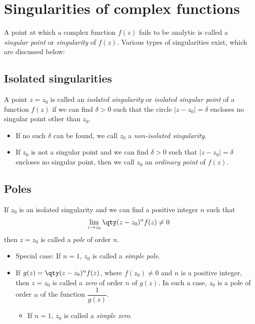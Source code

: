 \section{Singularities of complex functions}
	A point at which a complex function $f(z)$ fails to be analytic is called a \emph{singular point} or \emph{singularity} of $f(z)$. Various types of singularities exist, which are discussed below:
	
	\subsection{Isolated singularities}
		A point $z=z_0$ is called an \emph{isolated singularity} or \emph{isolated singular point} of a function $f(z)$ if we can find $\delta>0$ such that the circle $|z-z_0|=\delta$ encloses no singular point other than $z_0$.
		\begin{itemize}
			\item If no such $\delta$ can be found, we call $z_0$ a \emph{non-isolated singularity}.
			\item If $z_0$ is not a singular point and we can find $\delta>0$ such that $|z-z_0|=\delta$ encloses no singular
			point, then we call $z_0$ an \emph{ordinary point} of $f(z)$.
		\end{itemize}

	\subsection{Poles}
		If $z_0$ is an isolated singularity and we can find a positive integer $n$ such that
		\begin{align*}
			\lim_{z\to z_0}{\qty(z-z_0)^nf(z)\neq 0}
		\end{align*}
		then $z=z_0$ is called a \emph{pole} of order $n$.
		
		\begin{itemize}
			\item Special case: If $n=1$, $z_0$ is called a \emph{simple pole}.
			\item If $g(z)=\qty(z-z_0)^nf(z)$, where $f(z_0)\neq 0$ and $n$ is a positive integer, then $z=z_0$ is called a \emph{zero} of
			order $n$ of $g(z)$. In such a case, $z_0$ is a pole of order $n$ of the function $\dfrac{1}{g(z)}$.
			\begin{itemize}
				\item If $n=1$, $z_0$ is called a \emph{simple zero}.
			\end{itemize}
		\end{itemize}		
	
